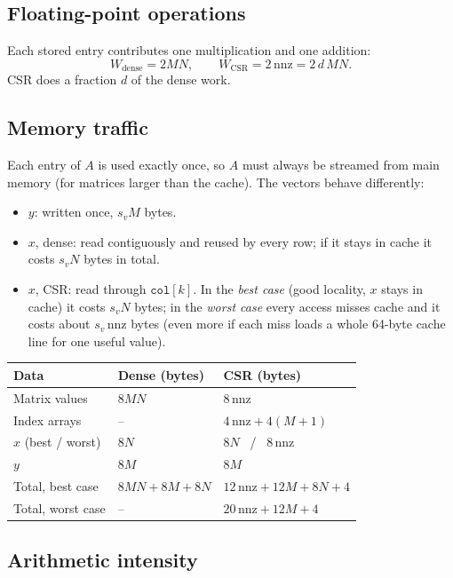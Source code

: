 \documentclass[11pt,a4paper]{article}
\newcommand{\id}[1]{\texttt{#1}}
\newcommand{\nnz}{\mathrm{nnz}}
\begin{document}
\subsection{Floating-point operations}

Each stored entry contributes one multiplication and one addition:
\[
  W_{\text{dense}} = 2MN, \qquad W_{\text{CSR}} = 2\,\nnz = 2\,d\,MN .
\]
CSR does a fraction $d$ of the dense work.

\subsection{Memory traffic}

Each entry of $A$ is used exactly once, so $A$ must always be streamed from
main memory (for matrices larger than the cache). The vectors behave
differently:

\begin{itemize}
  \item $y$: written once, $s_v M$ bytes.
  \item $x$, dense: read contiguously and reused by every row; if it stays in
        cache it costs $s_v N$ bytes in total.
  \item $x$, CSR: read through $\id{col}[k]$. In the \emph{best case} (good
        locality, $x$ stays in cache) it costs $s_v N$ bytes; in the
        \emph{worst case} every access misses cache and it costs about
        $s_v\,\nnz$ bytes (even more if each miss loads a whole 64-byte cache
        line for one useful value).
\end{itemize}

\begin{center}
\begin{tabular}{lll}
\toprule
Data & Dense (bytes) & CSR (bytes) \\
\midrule
Matrix values & $8MN$ & $8\,\nnz$ \\
Index arrays & -- & $4\,\nnz + 4(M+1)$ \\
$x$ (best / worst) & $8N$ & $8N$ \ / \ $8\,\nnz$ \\
$y$ & $8M$ & $8M$ \\
\midrule
Total, best case & $8MN + 8M + 8N$ & $12\,\nnz + 12M + 8N + 4$ \\
Total, worst case & -- & $20\,\nnz + 12M + 4$ \\
\bottomrule
\end{tabular}
\end{center}

\subsection{Arithmetic intensity}
\end{document}
